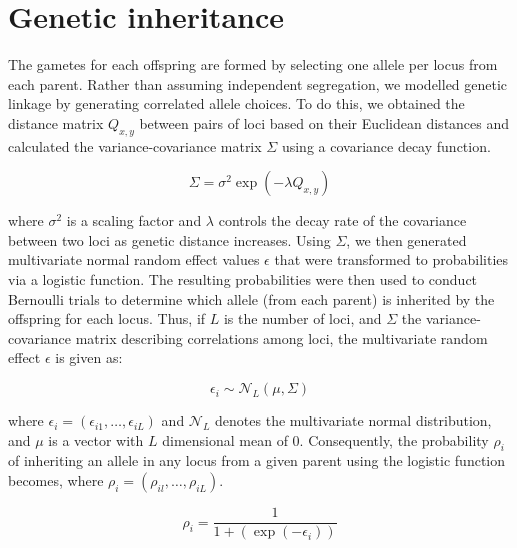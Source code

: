 \documentclass[
]{article}
\begin{document}
\section{Genetic inheritance}\label{genetic-inheritance}

The gametes for each offspring are formed by selecting one allele per
locus from each parent. Rather than assuming independent segregation, we
modelled genetic linkage by generating correlated allele choices. To do
this, we obtained the distance matrix \(Q_{x,y}\) between pairs of loci
based on their Euclidean distances and calculated the
variance-covariance matrix \(\Sigma\) using a covariance decay function.

\[
\Sigma = \sigma^2 \exp(−λQ_{x,y})
\]

where \(\sigma^2\) is a scaling factor and \(\lambda\) controls the
decay rate of the covariance between two loci as genetic distance
increases. Using \(\Sigma\), we then generated multivariate normal
random effect values \(\epsilon\) that were transformed to probabilities
via a logistic function. The resulting probabilities were then used to
conduct Bernoulli trials to determine which allele (from each parent) is
inherited by the offspring for each locus. Thus, if \(L\) is the number
of loci, and \(\Sigma\) the variance-covariance matrix describing
correlations among loci, the multivariate random effect \(\epsilon\) is
given as:

\[
\epsilon_i \sim \mathcal{N}_L\left(\mu, \Sigma \right)
\]

where \(\epsilon_i = (\epsilon_{i1}, \dots, \epsilon_{iL})\) and
\(\mathcal{N}_L\) denotes the multivariate normal distribution, and
\(\mu\) is a vector with \(L\) dimensional mean of 0. Consequently, the
probability \(\rho_{i}\) of inheriting an allele in any locus from a
given parent using the logistic function becomes, where
\(\rho_{i}  = (\rho_{il} , \dots,\rho_{iL})\).

\[
\rho_{i} = \frac{1}{1 + (\exp (-\epsilon_{i}))}
\]
\end{document}
